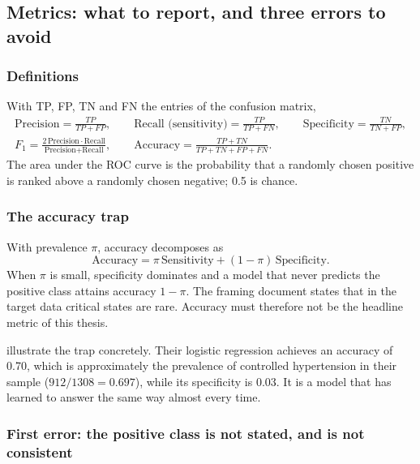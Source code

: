 \documentclass[12pt,a4paper,oneside]{report}
\begin{document}
\subsection{Metrics: what to report, and three errors to avoid}\label{sec:metrics}

\subsubsection{Definitions}

With TP, FP, TN and FN the entries of the confusion matrix,
\begin{gather}
  \text{Precision} = \frac{TP}{TP+FP}, \qquad
  \text{Recall (sensitivity)} = \frac{TP}{TP+FN}, \qquad
  \text{Specificity} = \frac{TN}{TN+FP},\\
  F_1 = \frac{2\,\text{Precision}\cdot\text{Recall}}{\text{Precision}+\text{Recall}}, \qquad
  \text{Accuracy} = \frac{TP+TN}{TP+TN+FP+FN}.
\end{gather}
The area under the ROC curve is the probability that a randomly chosen positive is ranked above a randomly chosen negative; 0.5 is chance.

\subsubsection{The accuracy trap}\label{sec:accuracy-trap}

With prevalence $\pi$, accuracy decomposes as
\begin{equation}
  \text{Accuracy} = \pi\,\text{Sensitivity} + (1-\pi)\,\text{Specificity}.
\end{equation}
When $\pi$ is small, specificity dominates and a model that never predicts the positive class attains accuracy $1-\pi$. The framing document states that in the target data critical states are rare. Accuracy must therefore not be the headline metric of this thesis.

\Textcite{mendoza2025} illustrate the trap concretely. Their logistic regression achieves an accuracy of 0.70, which is approximately the prevalence of controlled hypertension in their sample ($912/1308 = 0.697$), while its specificity is 0.03. It is a model that has learned to answer the same way almost every time.

\subsubsection{First error: the positive class is not stated, and is not consistent}\label{sec:positive-class}
\end{document}
